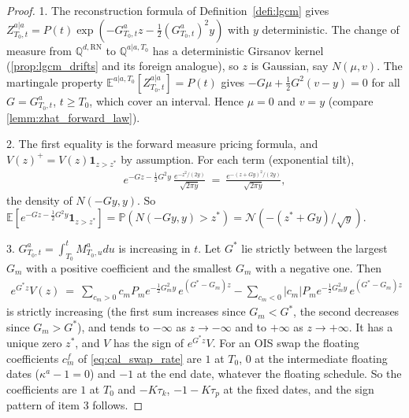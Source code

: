\documentclass[11pt,english]{amsart}
\newcommand{\vun}{\mathbf{1}}
\newcommand{\RN}{\mathrm{RN}}
\newcommand{\EE}{\mathbb{E}}
\newcommand{\PP}{\mathbb{P}}
\newcommand{\QQ}{\mathbb{Q}}
\theoremstyle{definition}
\begin{document}
\begin{proof}
1. The reconstruction formula of Definition~\ref{defi:lgcm} gives $Z^{a|a}_{T_0,t} = P(t)\exp(-G^a_{T_0,t}z - \frac{1}{2}(G^a_{T_0,t})^2y)$ with $y$ deterministic. The change of measure from $\QQ^{d,\RN}$ to $\QQ^{a|a,T_0}$ has a deterministic Girsanov kernel (\autoref{prop:lgcm_drifts} and its foreign analogue), so $z$ is Gaussian, say $N(\mu,v)$. The martingale property $\EE^{a|a,T_0}[Z^{a|a}_{T_0,t}] = P(t)$ gives $-G\mu + \frac{1}{2}G^2(v-y) = 0$ for all $G = G^a_{T_0,t}$, $t\ge T_0$, which cover an interval. Hence $\mu = 0$ and $v = y$ (compare \autoref{lemm:zhat_forward_law}).

2. The first equality is the forward measure pricing formula, and $V(z)^+ = V(z)\vun_{z>z^*}$ by assumption. For each term (exponential tilt),
\begin{eqnarray*}
  e^{-Gz-\frac{1}{2}G^2y}\,\frac{e^{-z^2/(2y)}}{\sqrt{2\pi y}} ~=~ \frac{e^{-(z+Gy)^2/(2y)}}{\sqrt{2\pi y}} ,
\end{eqnarray*}
the density of $N(-Gy,y)$. So $\EE[e^{-Gz-\frac{1}{2}G^2y}\vun_{z>z^*}] = \PP(N(-Gy,y)>z^*) = \mathcal{N}(-(z^*+Gy)/\sqrt{y})$.

3. $G^a_{T_0,t} = \int_{T_0}^tM^a_{T_0,u}du$ is increasing in $t$. Let $G^*$ lie strictly between the largest $G_m$ with a positive coefficient and the smallest $G_m$ with a negative one. Then
\begin{eqnarray*}
  e^{G^*z}V(z) ~=~ \sum_{c_m>0} c_mP_me^{-\frac{1}{2}G_m^2y}\,e^{(G^*-G_m)z} - \sum_{c_m<0}|c_m|P_me^{-\frac{1}{2}G_m^2y}\,e^{(G^*-G_m)z}
\end{eqnarray*}
is strictly increasing (the first sum increases since $G_m<G^*$, the second decreases since $G_m>G^*$), and tends to $-\infty$ as $z\to-\infty$ and to $+\infty$ as $z\to+\infty$. It has a unique zero $z^*$, and $V$ has the sign of $e^{G^*z}V$. For an OIS swap the floating coefficients $c^f_m$ of \eqref{eq:cal_swap_rate} are $1$ at $T_0$, $0$ at the intermediate floating dates ($\kappa^a - 1 = 0$) and $-1$ at the end date, whatever the floating schedule. So the coefficients are $1$ at $T_0$ and $-K\tau_k$, $-1-K\tau_p$ at the fixed dates, and the sign pattern of item 3 follows.
\end{proof}
\end{document}
